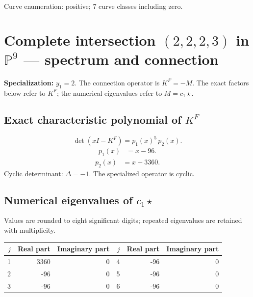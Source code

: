 \documentclass[10pt,a4paper]{article}
\begin{document}
Curve enumeration: positive; 7 curve classes including zero.
\clearpage\section*{Complete intersection $(2,2,2,3)$ in $\mathbb P^{9}$ --- spectrum and connection}
\textbf{Specialization:} $y_1=2$. The connection operator is $K^F=-M$. The exact factors below refer to $K^F$; the numerical eigenvalues refer to $M=c_1\star$.
\subsection*{Exact characteristic polynomial of $K^F$}
\[\det(xI-K^F)=p_{1}(x)^{5}\,p_{2}(x).\]
\[\begin{aligned}p_{1}(x)&=x - 96.\end{aligned}\]
\[\begin{aligned}p_{2}(x)&=x + 3360.\end{aligned}\]
Cyclic determinant: $\Delta=-1$. The specialized operator is cyclic.
\subsection*{Numerical eigenvalues of $c_1\star$}
Values are rounded to eight significant digits; repeated eigenvalues are retained with multiplicity.
\begin{center}\small\begin{tabular}{rrr@{\qquad}rrr}\toprule $j$ & Real part & Imaginary part & $j$ & Real part & Imaginary part\\\midrule
1 & 3360 & 0 & 4 & -96 & 0\\
2 & -96 & 0 & 5 & -96 & 0\\
3 & -96 & 0 & 6 & -96 & 0\\
\bottomrule\end{tabular}\end{center}
\end{document}
